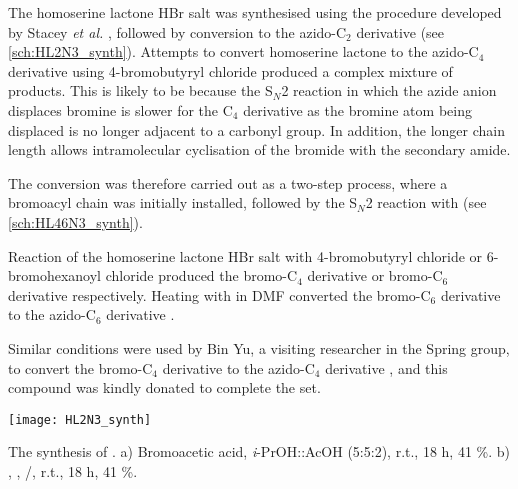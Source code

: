 The homoserine lactone HBr salt  was synthesised using the procedure developed by Stacey \textit{et al.} \cite{Stacy2013}, followed by conversion to the azido-C$_2$ derivative  (see \ref{sch:HL2N3_synth}). Attempts to convert homoserine lactone  to the azido-C$_4$ derivative using 4-bromobutyryl chloride  produced a complex mixture of products. This is likely to be because the S$_N$2 reaction in which the azide anion displaces bromine is slower for the C$_4$ derivative as the bromine atom being displaced is no longer adjacent to a carbonyl group. In addition, the longer chain length allows intramolecular cyclisation of the bromide with the secondary amide. 

The conversion was therefore carried out as a two-step process, where a bromoacyl chain was initially installed, followed by the S$_N$2 reaction with  (see \ref{sch:HL46N3_synth}). 

Reaction of the homoserine lactone HBr salt  with 4-bromobutyryl chloride  or 6-bromohexanoyl chloride  produced the bromo-C$_4$ derivative  or bromo-C$_6$ derivative  respectively. Heating with  in DMF converted the bromo-C$_6$ derivative  to the azido-C$_6$ derivative . 

Similar conditions were used by Bin Yu, a visiting researcher in the Spring group, to convert the bromo-C$_4$ derivative  to the azido-C$_4$ derivative , and this compound was kindly donated to complete the set.

\begin{scheme}[H]
	\begin{center}
		\texttt{[image: HL2N3\_synth]}
		\caption{The synthesis of .
		a) Bromoacetic acid, \textit{i}-PrOH::AcOH (5:5:2), r.t., 18 h, 41 \%.
		b) , , /, r.t., 18 h, 41 \%.
		\label{sch:HL2N3_synth}}
	\end{center}
\end{scheme}
%

